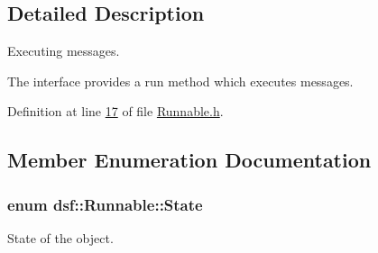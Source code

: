 \subsection{Detailed Description}
Executing messages. 

The interface provides a run method which executes messages. 

Definition at line \hyperlink{_runnable_8h_source_l00017}{17} of file \hyperlink{_runnable_8h_source}{Runnable.\+h}.



\subsection{Member Enumeration Documentation}
\hypertarget{classdsf_1_1_runnable_a8eb63b21a0accc7a6a2a05f18e257991}{}
\subsubsection[{State}]{\setlength{\rightskip}{0pt plus 5cm}enum {\bf dsf\+::\+Runnable\+::\+State}}\label{classdsf_1_1_runnable_a8eb63b21a0accc7a6a2a05f18e257991}


State of the object. 

